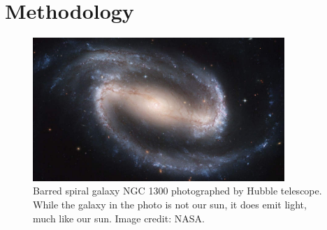 
\chapter{Methodology}
\begin{refsection}

\begin{figure}[ht]
    \centering
	\includegraphics[width=0.85\textwidth]{figures/sampleFig1.jpg} 
	\caption[Barred spiral galaxy NGC 1300]{Barred spiral galaxy NGC 1300 photographed by Hubble telescope. While the galaxy in the photo is not our sun, it does emit light, much like our sun. Image credit: NASA.}
	\label{fig:firstFig}
\end{figure}

\clearpage

\printbibliography[heading=subbibintoc, title={\centering Notes}]
\end{refsection}